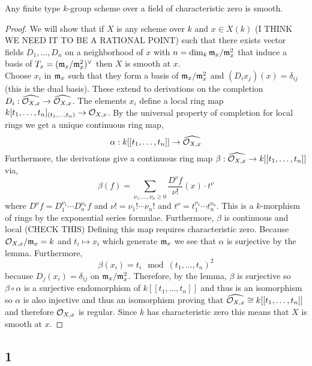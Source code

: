 \documentclass[12pt]{article}
\begin{document}
\begin{thm}[Cartier]
Any finite type $k$-group scheme over a field of characteristic zero is smooth.
\end{thm}

\begin{proof}
We will show that if $X$ is any scheme over $k$ and $x \in X(k)$ (I THINK WE NEED IT TO BE A RATIONAL POINT) such that there exists vector fields $D_1, \dots, D_n$ on a neighborhood of $x$ with $n = \dim_k \mathfrak{m}_x / \mathfrak{m}_x^2$ that induce a basis of $T_x = (\mathfrak{m}_x / \mathfrak{m}_x^2)^\vee$ then $X$ is smooth at $x$.
\bigskip\\
Choose $x_i$ in $\mathfrak{m}_x$ such that they form a basis of $\mathfrak{m}_x / \mathfrak{m}_x^2$ and $(D_i x_j)(x) = \delta_{ij}$ (this is the dual basis). These extend to derivations on the completion $D_i : \widehat{\mathcal{O}_{X, x}} \to \widehat{\mathcal{O}_{X, x}}$. The elements $x_i$ define a local ring map $k[t_1, \dots, t_n]_{(t_1, \dots, t_n)} \to \mathcal{O}_{X, x}$. By the universal property of completion for local rings we get a unique continuous ring map,
\[ \alpha : k[[t_1, \dots, t_n]] \to \widehat{\mathcal{O}_{X, x}} \]
Furthermore, the derivations give a continuous ring map $\beta : \widehat{\mathcal{O}_{X, x}} \to k[[t_1, \dots, t_n]]$ via,
\[ \beta(f) = \sum_{\nu_1, \dots, \nu_n \ge 0} \frac{D^\nu f}{\nu!}(x) \cdot t^{\nu} \]
where $D^\nu f = D_1^{\nu_1} \cdots D_n^{\nu_n} f$ and $\nu! = \nu_1 ! \cdots \nu_n !$ and $t^\nu = t_1^{\nu_1} \cdots t_n^{\nu_n}$. This is a $k$-morphism of rings by the exponential series formulae. Furthermore, $\beta$ is continuous and local (CHECK THIS) Defining this map requires characteristic zero. Because $\mathcal{O}_{X, x} /\mathfrak{m}_x = k$ and $t_i \mapsto x_i$ which generate $\mathfrak{m}_x$ we see that $\alpha$ is surjective by the lemma. Furthermore, 
\[ \beta(x_i) = t_i \mod (t_1, \dots, t_n)^2 \]
because $D_j(x_i) = \delta_{ij}$ on $\mathfrak{m}_x / \mathfrak{m}_x^2$. Therefore, by the lemma, $\beta$ is surjective so $\beta \circ \alpha$ is a surjective endomorphism of $k[[t_1, \dots, t_n]]$ and thus is an isomorphism so $\alpha$ is also injective and thus an isomorphism proving that $\widehat{\mathcal{O}_{X, x}} \cong k[[t_1, \dots, t_n]]$ and therefore $\mathcal{O}_{X, x}$ is regular. Since $k$ has characteristic zero this means that $X$ is smooth at $x$.


\end{proof}

\subsection{1}
\end{document}
